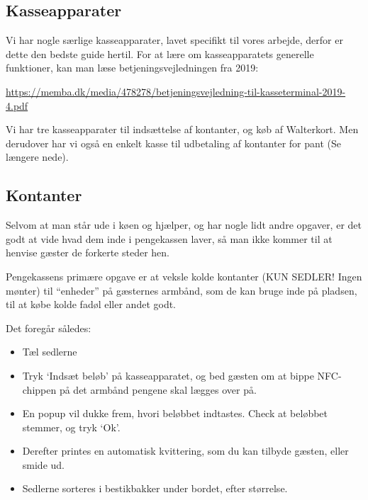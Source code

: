 \subsection{Kasseapparater}
Vi har nogle særlige kasseapparater, lavet specifikt til vores arbejde, derfor er dette den bedste guide hertil. 
For at lære om kasseapparatets generelle funktioner, kan man læse betjeningsvejledningen fra 2019:
\begin{center}
  \small
  \href{https://memba.dk/media/478278/betjeningsvejledning-til-kasseterminal-2019-4.pdf}{https://memba.dk/media/478278/betjeningsvejledning-til-kasseterminal-2019-4.pdf}
\end{center}

Vi har tre kasseapparater til indsættelse af kontanter, og køb af Walterkort. Men derudover har vi også en 
enkelt kasse til udbetaling af kontanter for pant (Se længere nede).

\subsection{Kontanter}

Selvom at man står ude i køen og hjælper, og har nogle lidt andre opgaver, 
er det godt at vide hvad dem inde i pengekassen laver, 
så man ikke kommer til at henvise gæster de forkerte steder hen.

Pengekassens primære opgave er at veksle kolde kontanter (KUN SEDLER! Ingen mønter) til ``enheder'' på gæsternes armbånd, 
som de kan bruge inde på pladsen, til at købe kolde fadøl eller andet godt.

Det foregår således:
\begin{itemize}
  \item Tæl sedlerne
  \item Tryk `Indsæt beløb' på kasseapparatet, og bed gæsten om at bippe NFC-chippen på det armbånd pengene 
  skal lægges over på.
  \item En popup vil dukke frem, hvori beløbbet indtastes. 
  Check at beløbbet stemmer, og tryk `Ok'.
  \item Derefter printes en automatisk kvittering, som du kan tilbyde gæsten, eller smide ud.
  \item Sedlerne sorteres i bestikbakker under bordet, efter størrelse.
\end{itemize}

